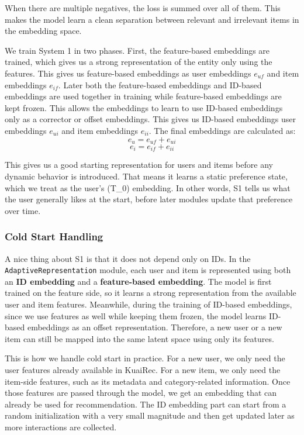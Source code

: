 When there are multiple negatives, the loss is summed over all of them. 
This makes the model learn a clean separation between relevant and irrelevant items in the embedding space.

We train System 1 in two phases. 
First, the feature-based embeddings are trained, which gives us a strong representation of the entity only using the features.
This gives us feature-based embeddings as user embeddings $e_{uf}$ and item embeddings $e_{if}$.
Later both the feature-based embeddings and ID-based embeddings are used together in training while feature-based embeddings are kept frozen.
This allows the embeddings to learn to use ID-based embeddings only as a corrector or offset embeddings.
This gives us ID-based embeddings user embeddings $e_{ui}$ and item embeddings $e_{ii}$.
The final embeddings are calculated as:
\begin{equation}
    e_u = e_{uf} + e_{ui}
\end{equation} \begin{equation}
    e_i = e_{if} + e_{ii}    
\end{equation}

This gives us a good starting representation for users and items before any dynamic behavior is introduced.
That means it learns a static preference state, which we treat as the user's (T\_0) embedding.
In other words, S1 tells us what the user generally likes at the start, before later modules update that preference over time.

\subsubsection*{Cold Start Handling}

A nice thing about S1 is that it does not depend only on IDs. 
In the \texttt{AdaptiveRepresentation} module, each user and item is represented using both an \textbf{ID embedding} and a \textbf{feature-based embedding}.
The model is first trained on the feature side, so it learns a strong representation from the available user and item features. 
Meanwhile, during the training of ID-based embeddings, since we use features as well while keeping them frozen, the model learns ID-based embeddings as an offset representation.
Therefore, a new user or a new item can still be mapped into the same latent space using only its features.

This is how we handle cold start in practice. 
For a new user, we only need the user features already available in KuaiRec.
For a new item, we only need the item-side features, such as its metadata and category-related information. 
Once those features are passed through the model, we get an embedding that can already be used for recommendation. 
The ID embedding part can start from a random initialization with a very small magnitude and then get updated later as more interactions are collected.

